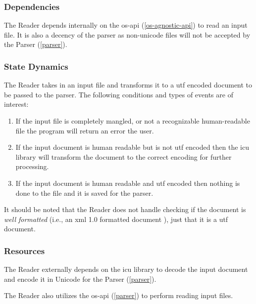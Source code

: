\subsubsection{Dependencies}

The Reader depends internally on the \gls{os-api} (\ref{os-agnostic-api}) to read an input file.
It is also a decency of the parser as non-unicode files will not be accepted by the Parser (\ref{parser}).

\subsubsection{State Dynamics}

The Reader takes in an input file and transforms it to a \gls{utf} encoded document to be passed to the parser.
The following conditions and types of events are of interest:

\begin{enumerate}
	\item If the input file is completely mangled, or not a recognizable human-readable file the program will return an error the user.
    \item If the input document is human readable but is not \gls{utf} encoded then the \gls{icu} library will transform the document to the correct encoding for further processing.
    \item If the input document is human readable and \gls{utf} encoded then nothing is done to the file and it is saved for the parser.
\end{enumerate}

It should be noted that the Reader does not handle checking if the document is \textit{well formatted} (i.e., an \gls{xml} 1.0 formatted document \cite{xml-spec}), just that it is a \gls{utf} document.

\subsubsection{Resources}

The Reader externally depends on the \gls{icu} library to decode the input document and encode it in Unicode for the Parser (\ref{parser}). \cite{icu-library}

The Reader also utilizes the \gls{os-api} (\ref{parser}) to perform reading input files.


